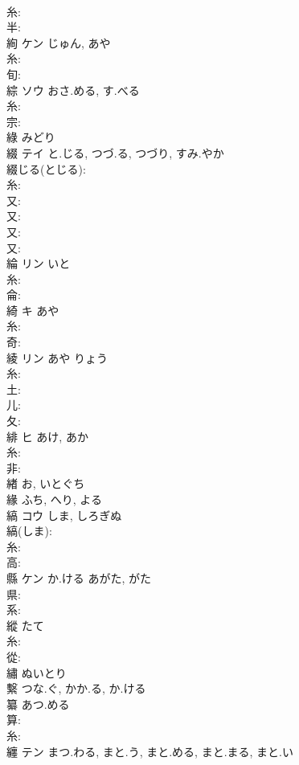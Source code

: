 \documentclass[8pt]{extreport}
\begin{document}
\begin{CJK}{UTF8}{min}
\\	糸: 
\\	半: 
\\	絢	ケン		じゅん, あや	
\\	糸: 
\\	旬: 
\\	綜	ソウ	おさ.める, す.べる		
\\	糸: 
\\	宗: 
\\	綠		みどり				
\\	綴	テイ	と.じる, つづ.る, つづり, すみ.やか		
\\	綴じる(とじる): 
\\	糸: 
\\	又: 
\\	又: 
\\	又: 
\\	又: 
\\	綸	リン	いと		
\\	糸: 
\\	侖: 
\\	綺	キ	あや		
\\	糸: 
\\	奇: 
\\	綾	リン	あや	りょう	
\\	糸: 
\\	土: 
\\	儿: 
\\	夂: 
\\	緋	ヒ	あけ, あか		
\\	糸: 
\\	非: 
\\	緖		お, いとぐち				
\\	緣		ふち, へり, よる				
\\	縞	コウ	しま, しろぎぬ		
\\	縞(しま): 
\\	糸: 
\\	高: 
\\	縣	ケン	か.ける	あがた, がた			
\\	県: 
\\	系: 
\\	縱		たて				
\\	糸: 
\\	從: 
\\	繡		ぬいとり				
\\	繫		つな.ぐ, かか.る, か.ける				
\\	纂		あつ.める			
\\	算: 
\\	糸: 
\\	纏	テン	まつ.わる, まと.う, まと.める, まと.まる, まと.い		

\end{CJK}
\end{document}
